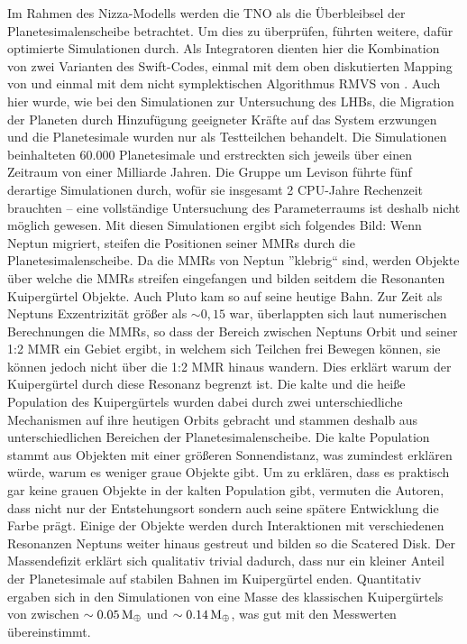 \documentclass[12pt,a4paper,twoside]{article}
\renewcommand{\cite}{\citep}
\newcommand{\ME}{M_\oplus}
\begin{document}
\noindent
Im Rahmen des Nizza-Modells werden die TNO als die Überbleibsel der Planetesimalenscheibe betrachtet.
Um dies zu überprüfen, führten \cite{Levison2008} weitere, dafür optimierte Simulationen durch. Als Integratoren  dienten hier die Kombination von zwei Varianten des Swift-Codes, einmal mit dem oben diskutierten Mapping von \cite{Wisdom1991} und einmal mit dem nicht symplektischen Algorithmus RMVS von \cite{Levison1994}. Auch hier wurde, wie bei den Simulationen zur Untersuchung des LHBs, die Migration der Planeten durch Hinzufügung geeigneter Kräfte auf das System erzwungen und die Planetesimale wurden nur als Testteilchen behandelt\cite{Levison2008}.
Die Simulationen beinhalteten 60.000 Planetesimale und erstreckten sich jeweils über einen Zeitraum von einer Milliarde Jahren\cite{Levison2008}. Die Gruppe um Levison führte fünf derartige Simulationen durch, wofür sie insgesamt 2 CPU-Jahre Rechenzeit brauchten – eine vollständige Untersuchung des Parameterraums ist deshalb nicht möglich gewesen\cite{Levison2008}.
Mit diesen Simulationen ergibt sich folgendes Bild:
Wenn Neptun migriert, steifen die Positionen seiner MMRs durch die Planetesimalenscheibe. Da die MMRs von Neptun ''klebrig`` sind\cite{Levison2008}, werden Objekte über welche die MMRs streifen eingefangen und bilden seitdem die Resonanten Kuipergürtel Objekte. Auch Pluto kam so auf seine heutige Bahn.
Zur Zeit als Neptuns Exzentrizität größer als $\sim 0,15$ war, überlappten sich laut numerischen Berechnungen die MMRs, so dass der Bereich zwischen Neptuns Orbit und seiner 1:2 MMR ein Gebiet ergibt, in welchem sich Teilchen frei Bewegen können, sie können jedoch nicht über die 1:2 MMR hinaus wandern\cite{Levison2008}. Dies erklärt warum der Kuipergürtel durch diese Resonanz begrenzt ist.
Die kalte und die heiße Population des Kuipergürtels wurden dabei durch zwei unterschiedliche Mechanismen auf ihre heutigen Orbits gebracht und stammen deshalb aus unterschiedlichen Bereichen der Planetesimalenscheibe. Die kalte Population stammt aus Objekten mit einer größeren Sonnendistanz, was zumindest erklären würde, warum es weniger graue Objekte gibt. Um zu erklären, dass es praktisch gar keine grauen Objekte in der kalten Population gibt, vermuten die Autoren, dass nicht nur der Entstehungsort sondern auch seine spätere Entwicklung die Farbe prägt\cite{Levison2008}.
Einige der Objekte werden durch Interaktionen mit verschiedenen Resonanzen Neptuns weiter hinaus gestreut und bilden so die Scatered Disk\cite{Levison2008}.
Der Massendefizit erklärt sich qualitativ trivial dadurch, dass nur ein kleiner Anteil der Planetesimale auf stabilen Bahnen im Kuipergürtel enden. Quantitativ ergaben sich in den Simulationen von \cite{Levison2008} eine Masse des klassischen Kuipergürtels von zwischen $\sim\unit[0.05]{\ME}$ und $\sim\unit[0.14]{\ME}$, was gut mit den Messwerten übereinstimmt.
\end{document}
